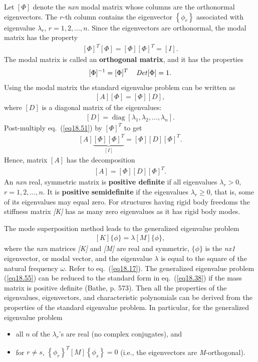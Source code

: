 \documentclass{AeroStructure-ERJohnson}
\begin{document}
Let $[\Phi]$ denote the \textit{nxn} modal matrix whose columns are the orthonormal eigenvectors. The $r$-th column contains the eigenvector $\left\{\phi_{r}\right\}$ associated with eigenvalue $\lambda_{r}$, $r=1,2, \ldots, n$. Since the eigenvectors are orthonormal, the modal matrix has the property
\begin{align}\label{eq18.49}
[\Phi]^{T}[\Phi]=[\Phi][\Phi]^{T}=[I].
\end{align}
The modal matrix is called an \textbf{orthogonal matrix}, and it has the properties
\begin{align}\label{eq18.50}
[\Phi]^{-1}=[\Phi]^{T} \quad \operatorname{\it Det}[\Phi]=1.
\end{align}
Using the modal matrix the standard eigenvalue problem can be written as
\begin{align}\label{eq18.51}
[A][\Phi]=[\Phi][D],
\end{align}
where $[D]$ is a diagonal matrix of the eigenvalues:
\begin{align}\label{eq18.52}
[D]=\operatorname{diag}\left[\lambda_{1}, \lambda_{2}, \ldots, \lambda_{n}\right].
\end{align}
Post-multiply eq.~(\ref{eq18.51}) by $[\Phi]^{T}$ to get
\begin{align}\label{eq18.53}
[A] \underbrace{[\Phi][\Phi]^{T}}_{[I]}=[\Phi][D][\Phi]^{T}.
\end{align}
Hence, matrix $[A]$ has the decomposition
\begin{align}\label{eq18.54}
[A]=[\Phi][D][\Phi]^{T}.
\end{align}
\indent An \textit{nxn} real, symmetric matrix is \textbf{positive definite} if all eigenvalues $\lambda_{r}>0$, $r=1,2, \ldots, n$. It is \textbf{positive} \textbf{semidefinite} if the eigenvalues $\lambda_{r} \geq 0$, that is, some of its eigenvalues may equal zero. For structures having rigid body freedoms the stiffness matrix \textit{[K]} has as many zero eigenvalues as it has rigid body modes.

The mode superposition method leads to the generalized eigenvalue problem
\begin{align}\label{eq18.55}
[K]\{\phi\}=\lambda[M]\{\phi\},
\end{align}
where the \textit{nxn} matrices \textit{[K]} and \textit{[M]} are real and symmetric, $\{\phi\}$ is the \textit{nx1} eigenvector, or modal vector, and the eigenvalue $\lambda$ is equal to the square of the natural frequency $\omega$. Refer to eq.~(\ref{eq18.17}). The generalized eigenvalue problem (\ref{eq18.55}) can be reduced to the standard form in eq.~(\ref{eq18.38}) if the mass matrix is positive definite (Bathe, p. 573). Then all the properties of the eigenvalues, eigenvectors, and characteristic polynomials can be derived from the properties of the standard eigenvalue problem. In particular, for the generalized eigenvalue problem
\begin{itemize}
  \item all $n$ of the $\lambda_{r}$'s are real (no complex conjugates), and
  \item for $r \neq s$, $\left\{\phi_{r}\right\}^{T}[M]\left\{\phi_{s}\right\}=0$ (i.e., the eigenvectors are \textit{M}-orthogonal).
\end{itemize}
\end{document}
